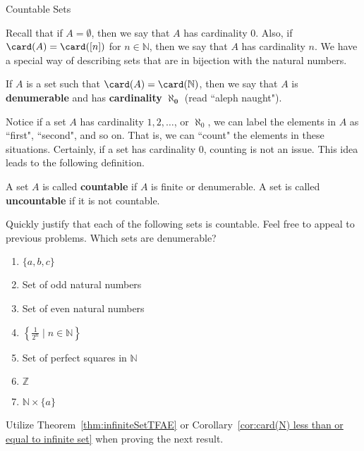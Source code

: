 \begin{section}{Countable Sets}

Recall that if $A=\emptyset$, then we say that $A$ has cardinality 0.  Also, if $\card(A)=\card([n])$ for $n\in\mathbb{N}$, then we say that $A$ has cardinality $n$.  We have a special way of describing sets that are in bijection with the natural numbers.

\begin{definition}
If $A$ is a set such that $\card(A)=\card(\mathbb{N})$, then we say that $A$ is \textbf{denumerable} and has \textbf{cardinality} $\mathbf{\aleph_0}$ (read ``aleph naught").
\end{definition}

Notice if a set $A$ has cardinality $1,2,\ldots$, or $\aleph_0$, we can label the elements in $A$ as ``first", ``second", and so on.  That is, we can ``count" the elements in these situations. Certainly, if a set has cardinality 0, counting is not an issue.  This idea leads to the following definition.

\begin{definition}\label{def:countable}
A set $A$ is called \textbf{countable} if $A$ is finite or denumerable. A set is called \textbf{uncountable} if it is not countable.
\end{definition}

\begin{problem}
Quickly justify that each of the following sets is countable. Feel free to appeal to previous problems. Which sets are denumerable?
\begin{enumerate}[label=\textrm{(\alph*)}]
\item $\{a,b,c\}$
\item Set of odd natural numbers
\item Set of even natural numbers
\item $\left\{\frac{1}{2^n}\mid n\in \mathbb{N}\right\}$
\item Set of perfect squares in $\mathbb{N}$
\item $\mathbb{Z}$
\item $\mathbb{N}\times \{a\}$
\end{enumerate}
\end{problem}

Utilize Theorem~\ref{thm:infiniteSetTFAE} or Corollary~\ref{cor:card(N) less than or equal to infinite set} when proving the next result.


\end{section}
